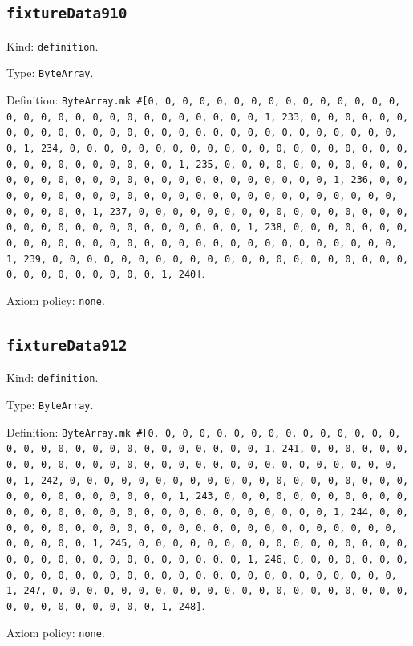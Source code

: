 \documentclass[11pt]{article}
\begin{document}
\subsection*{\texttt{fixtureData910}}
\noindent Kind: \texttt{definition}.\par
\noindent Type: \texttt{ByteArray}.\par
\noindent Definition: \texttt{ByteArray.mk \#[0, 0, 0, 0, 0, 0, 0, 0, 0, 0, 0, 0, 0, 0, 0, 0, 0, 0, 0, 0, 0, 0, 0, 0, 0, 0, 0, 0, 0, 0, 1, 233, 0, 0, 0, 0, 0, 0, 0, 0, 0, 0, 0, 0, 0, 0, 0, 0, 0, 0, 0, 0, 0, 0, 0, 0, 0, 0, 0, 0, 0, 0, 1, 234, 0, 0, 0, 0, 0, 0, 0, 0, 0, 0, 0, 0, 0, 0, 0, 0, 0, 0, 0, 0, 0, 0, 0, 0, 0, 0, 0, 0, 0, 0, 1, 235, 0, 0, 0, 0, 0, 0, 0, 0, 0, 0, 0, 0, 0, 0, 0, 0, 0, 0, 0, 0, 0, 0, 0, 0, 0, 0, 0, 0, 0, 0, 1, 236, 0, 0, 0, 0, 0, 0, 0, 0, 0, 0, 0, 0, 0, 0, 0, 0, 0, 0, 0, 0, 0, 0, 0, 0, 0, 0, 0, 0, 0, 0, 1, 237, 0, 0, 0, 0, 0, 0, 0, 0, 0, 0, 0, 0, 0, 0, 0, 0, 0, 0, 0, 0, 0, 0, 0, 0, 0, 0, 0, 0, 0, 0, 1, 238, 0, 0, 0, 0, 0, 0, 0, 0, 0, 0, 0, 0, 0, 0, 0, 0, 0, 0, 0, 0, 0, 0, 0, 0, 0, 0, 0, 0, 0, 0, 1, 239, 0, 0, 0, 0, 0, 0, 0, 0, 0, 0, 0, 0, 0, 0, 0, 0, 0, 0, 0, 0, 0, 0, 0, 0, 0, 0, 0, 0, 0, 0, 1, 240]}.\par
\noindent Axiom policy: \texttt{none}.\par
\subsection*{\texttt{fixtureData912}}
\noindent Kind: \texttt{definition}.\par
\noindent Type: \texttt{ByteArray}.\par
\noindent Definition: \texttt{ByteArray.mk \#[0, 0, 0, 0, 0, 0, 0, 0, 0, 0, 0, 0, 0, 0, 0, 0, 0, 0, 0, 0, 0, 0, 0, 0, 0, 0, 0, 0, 0, 0, 1, 241, 0, 0, 0, 0, 0, 0, 0, 0, 0, 0, 0, 0, 0, 0, 0, 0, 0, 0, 0, 0, 0, 0, 0, 0, 0, 0, 0, 0, 0, 0, 1, 242, 0, 0, 0, 0, 0, 0, 0, 0, 0, 0, 0, 0, 0, 0, 0, 0, 0, 0, 0, 0, 0, 0, 0, 0, 0, 0, 0, 0, 0, 0, 1, 243, 0, 0, 0, 0, 0, 0, 0, 0, 0, 0, 0, 0, 0, 0, 0, 0, 0, 0, 0, 0, 0, 0, 0, 0, 0, 0, 0, 0, 0, 0, 1, 244, 0, 0, 0, 0, 0, 0, 0, 0, 0, 0, 0, 0, 0, 0, 0, 0, 0, 0, 0, 0, 0, 0, 0, 0, 0, 0, 0, 0, 0, 0, 1, 245, 0, 0, 0, 0, 0, 0, 0, 0, 0, 0, 0, 0, 0, 0, 0, 0, 0, 0, 0, 0, 0, 0, 0, 0, 0, 0, 0, 0, 0, 0, 1, 246, 0, 0, 0, 0, 0, 0, 0, 0, 0, 0, 0, 0, 0, 0, 0, 0, 0, 0, 0, 0, 0, 0, 0, 0, 0, 0, 0, 0, 0, 0, 1, 247, 0, 0, 0, 0, 0, 0, 0, 0, 0, 0, 0, 0, 0, 0, 0, 0, 0, 0, 0, 0, 0, 0, 0, 0, 0, 0, 0, 0, 0, 0, 1, 248]}.\par
\noindent Axiom policy: \texttt{none}.\par
\end{document}
